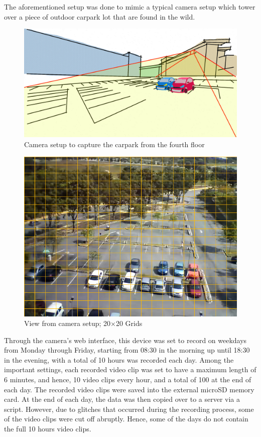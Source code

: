 The aforementioned setup was done to mimic a typical camera setup which tower over a piece of outdoor carpark lot that are found in the wild. 


\begin{figure}[hbt!]\centering
\includegraphics[width=.8\textwidth]{image/fcicarpark2.png}
\caption{Camera setup to capture the carpark from the fourth floor}
\label{fig:camerasetup}
\end{figure}


\begin{figure}[!hbt]\centering
\includegraphics[width=.7\textwidth]{image/general/grids.png}
\caption{View from camera setup; 20$\times$20 Grids}
\label{fig:viewfromcamera}
\end{figure}


Through the camera's web interface, this device was set to record on weekdays from Monday through Friday, starting from 08:30 in the morning up until 18:30 in the evening, with a total of 10 hours was recorded each day. Among the important settings, each recorded video clip was set to have a maximum length of 6 minutes, and hence, 10 video clips every hour, and a total of 100 at the end of each day. The recorded video clips were saved into the external microSD memory card. At the end of each day, the data was then copied over to a server via a script. However, due to glitches that occurred during the recording process, some of the video clips were cut off abruptly. Hence, some of the days do not contain the full 10 hours video clips. 

